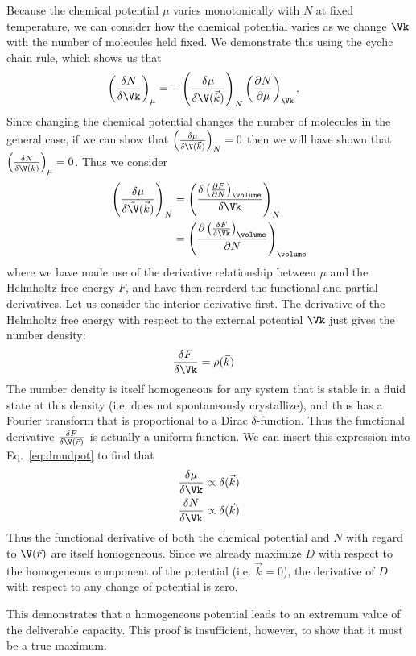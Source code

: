 \documentclass[twocolumn]{article}
\begin{document}
Because the chemical potential $\mu$ varies monotonically with $N$ at fixed temperature, we can consider how the chemical potential varies as we change $\Vk$ with the number of molecules held fixed.  We demonstrate this using the cyclic chain rule, which shows us that
\begin{align}
    \left(\frac{\delta N}{\delta \Vk}\right)_{\mu} &=
    -\left(\frac{\delta \mu}{\delta \V(\vec k)}\right)_{N}
    \left(\frac{\partial N}{\partial \mu}\right)_{\Vk}.
\end{align}
Since changing the chemical potential changes the number of molecules in the general case, if we can show that $\left(\frac{\delta \mu}{\delta \V(\vec k)}\right)_{N}=0$ then we will have shown that $\left(\frac{\delta N}{\delta \V(\vec k)}\right)_{\mu}=0$.  Thus we consider
\begin{align}
    \left(\frac{\delta \mu}{\delta \tilde\V(\vec k)}\right)_N
    &= \left(\frac{\delta \left(\frac{\partial F}{\partial N}\right)_{\volume}}{\delta \Vk}\right)_N
    \\
    &= \left(\frac{\partial \left(\frac{\delta F}{\delta \Vk}\right)_{\volume}}{\partial N}\right)_{\volume}
    \label{eq:dmudpot}
\end{align}
where we have made use of the derivative relationship between $\mu$ and the Helmholtz free energy $F$, and have then reorderd the functional and partial derivatives.
Let us consider the interior derivative first.  The derivative of the Helmholtz free energy with respect to the external potential $\Vk$ just gives the number density:
\begin{align}
    \frac{\delta F}{\delta \Vk} &= \rho(\vec k)
\end{align}
The number density is itself homogeneous for any system that is stable in a fluid state at this density (i.e. does not spontaneously crystallize), and thus has a Fourier transform that is proportional to a Dirac $\delta$-function.  Thus the functional derivative $\frac{\delta F}{\delta \V(\vec r)}$ is actually a uniform function.
We can insert this expression into Eq.~\ref{eq:dmudpot} to find that
\begin{align}
    \frac{\delta \mu}{\delta \Vk} &\propto \delta(\vec k) \\
    \frac{\delta N}{\delta \Vk} &\propto \delta(\vec k)
\end{align}
Thus the functional derivative of both the chemical potential and $N$ with regard to $\V(\vec r)$ are itself homogeneous.  Since we already maximize $D$ with respect to the homogeneous component of the potential (i.e. $\vec k=0$), the derivative of $D$ with respect to any change of potential is zero.

This demonstrates that a homogeneous potential leads to an extremum value of the deliverable capacity.  This proof is insufficient, however, to show that it must be a true maximum.
\end{document}
